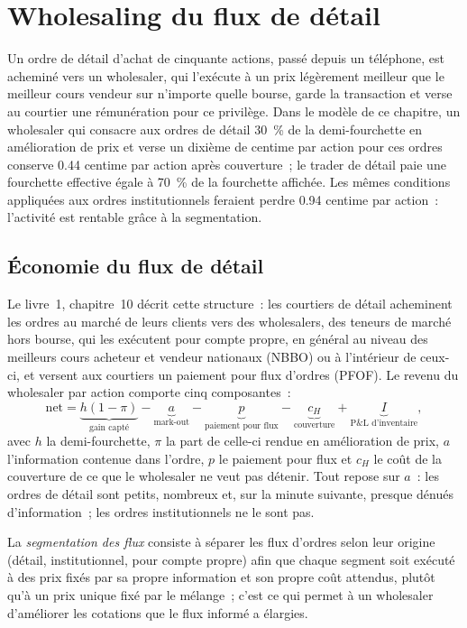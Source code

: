 \chapter{Wholesaling du flux de détail}\label{ch:hf:retail-wholesaling}

Un ordre de détail d'achat de cinquante actions, passé depuis un téléphone, est acheminé vers un wholesaler, qui l'exécute à un prix légèrement meilleur que le meilleur cours vendeur sur n'importe quelle bourse,
garde la transaction et verse au courtier une rémunération pour ce privilège. Dans le modèle de ce chapitre, un wholesaler qui consacre aux ordres de détail 30~\% de la demi-fourchette en amélioration de prix
et verse un dixième de centime par action pour ces ordres conserve 0.44 centime par action après couverture~; le trader de détail paie une fourchette effective égale à 70~\% de la fourchette affichée.
Les mêmes conditions appliquées aux ordres institutionnels feraient perdre 0.94 centime par action~: l'activité est rentable grâce à la
segmentation.

\section{Économie du flux de détail}

Le livre~1, chapitre~10 décrit cette structure~: les courtiers de détail acheminent les ordres au marché de leurs clients vers des wholesalers, des teneurs de marché hors bourse,
qui les exécutent pour compte propre, en général au niveau des meilleurs cours acheteur et vendeur nationaux (NBBO) ou à l'intérieur de ceux-ci, et versent aux courtiers un paiement pour flux d'ordres (PFOF). Le revenu du wholesaler
par action comporte cinq composantes~:
\[
\text{net}=\underbrace{h(1-\pi)}_{\text{gain capté}}-\underbrace{a}_{\text{mark-out}}-\underbrace{p}_{\text{paiement pour flux}}
-\underbrace{c_H}_{\text{couverture}}+\underbrace{I}_{\text{P\&L d'inventaire}},
\]
avec $h$ la demi-fourchette, $\pi$ la part de celle-ci rendue en amélioration de prix, $a$ l'information contenue dans l'ordre, $p$ le paiement pour flux et $c_H$ le
coût de la couverture de ce que le wholesaler ne veut pas détenir. Tout repose sur $a$~: les ordres de détail sont petits, nombreux et, sur la minute suivante, presque
dénués d'information~; les ordres institutionnels ne le sont pas.

\begin{definition}\label{def:hf:retail-wholesaling:segmentation}
La \emph{segmentation des flux} consiste à séparer les flux d'ordres selon leur origine (détail, institutionnel, pour compte propre) afin que chaque segment
soit exécuté à des prix fixés par sa propre information et son propre coût attendus, plutôt qu'à un prix unique fixé par le mélange~; c'est ce qui permet à un wholesaler
d'améliorer les cotations que le flux informé a élargies.
\end{definition}

